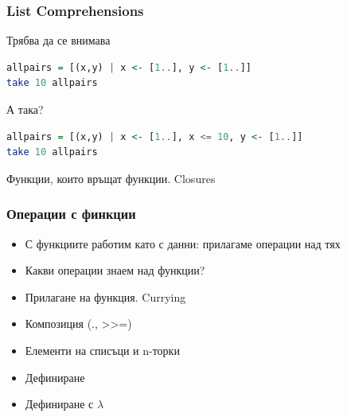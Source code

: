 \documentclass{beamer}
\begin{document}
\begin{frame}[fragile]
  \frametitle{List Comprehensions}

Трябва да се внимава

\bigskip

\begin{lstlisting}[basicstyle=\small,language=Haskell]
allpairs = [(x,y) | x <- [1..], y <- [1..]]
take 10 allpairs
\end{lstlisting}
  
\bigskip

А така?

\begin{lstlisting}[basicstyle=\small,language=Haskell]
allpairs = [(x,y) | x <- [1..], x <= 10, y <- [1..]]
take 10 allpairs
\end{lstlisting}

\end{frame}  

\begin{frame}
  \centerline{Функции, които връщат функции. Closures}
\end{frame}

\begin{frame}[fragile]
  \frametitle{Операции с финкции}

\begin{itemize}
  \item С функциите работим като с данни: прилагаме операции над тях
  \item Какви операции знаем над функции?
\end{itemize}

\bigskip

\begin{itemize}
  \item Прилагане на функция. Currying
  \item Композиция (., >>=)
  \item Елементи на списъци и n-торки
  \item Дефиниране
  \item Дефиниране с $\lambda$
\end{itemize}

\end{frame}
\end{document}
